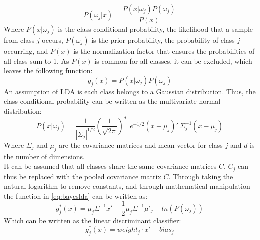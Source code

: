 \begin{equation}
	P(\omega_{j}|x) = \frac{P(x|\omega_{j})P(\omega_{j})}{P(x)}
\end{equation}
\vspace{-0.02cm}
\noindent Where $P(x|\omega_{j})$ is the class conditional probability, the likelihood that a sample from class $j$ occurs, $P(\omega_{j})$ is the prior probability, the probability of class $j$ occurring, and $P(x)$ is the normalization factor that ensures the probabilities of all class sum to 1. As $P(x)$ is common for all classes, it can be excluded, which leaves the following function:
\vspace{-0.1cm}
\begin{equation} \label{eq:bayeslda}
	g_{j}(x) = P(x|\omega_{j})P(\omega_{j})
\end{equation} 
\vspace{-0.02cm}
\noindent An assumption of LDA is each class belongs to a Gaussian distribution. Thus, the class conditional probability can be written as the multivariate normal distribution:
\vspace{-0.1cm}
\begin{equation}
P(x|\omega_{j}) = \frac{1}{|\varSigma_{j}|^{1/2}}(\frac{1}{\sqrt{2\pi}})^{d} ~~e^{-1/2} (x-\mu_{j})' ~\varSigma^{-1}_{j} (x-\mu_{j})
\end{equation} 
\vspace{-0.1cm}
\noindent Where $\varSigma_{j}$ and $\mu_{j}$ are the covariance matrices and mean vector for class $j$ and $d$ is the number of dimensions. \\
It can be assumed that all classes share the same covariance matrices $C$. $C_{j}$ can thus be replaced with the pooled covariance matrix $C$. Through taking the natural logarithm to remove constants, and through mathematical manipulation the function in \eqref{eq:bayeslda} can be written as:
\vspace{-0.1cm}
\begin{equation} 
	g_{j}^{*}(x) = \mu_{j}\varSigma^{-1}x' - \frac{1}{2}\mu_{j}\varSigma^{-1}\mu'_{j} - ln(P(\omega_{j}))
\end{equation}
\vspace{-0.01cm}
\noindent Which can be written as the linear discriminant classifier:
\vspace{-0.1cm}
\begin{equation} \label{eq:ldclassifier}
	g_{j}^{*}(x) = weight_{j}\cdot x' + bias_{j}
\end{equation}
\vspace{-0.1cm}
